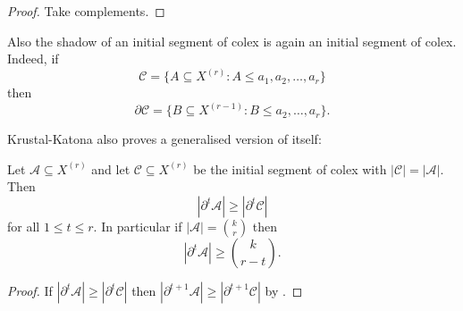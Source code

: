 \documentclass[a4paper]{article}
\newcommand{\shadow}{\partial}
\begin{document}
\begin{proof}
  Take complements.
\end{proof}

Also the shadow of an initial segment of colex is again an initial segment of colex. Indeed, if
\[
  \mathcal C = \{A \subseteq X^{(r)}: A \leq a_1,a_2,\dots,a_r\}
\]
then
\[
  \shadow \mathcal C = \{B \subseteq X^{(r - 1)}: B \leq a_2,\dots,a_r\}.
\]

Krustal-Katona also proves a generalised version of itself:

\begin{corollary}
  Let \(\mathcal A \subseteq X^{(r)}\) and let \(\mathcal C \subseteq X^{(r)}\) be the initial segment of colex with \(|\mathcal C| = |\mathcal A|\). Then
  \[
    |\shadow^t \mathcal A| \geq |\shadow^t \mathcal C|
  \]
  for all \(1 \leq t \leq r\). In particular if \(|\mathcal A| = \binom{k}{r}\) then
  \[
    |\shadow^t \mathcal A| \geq \binom{k}{r - t}.
  \]
\end{corollary}

\begin{proof}
  If \(|\shadow^t \mathcal A| \geq |\shadow^t \mathcal C|\) then \(|\shadow^{t + 1}\mathcal A| \geq |\shadow^{t + 1} \mathcal C|\) by .
\end{proof}








\printindex
\end{document}
